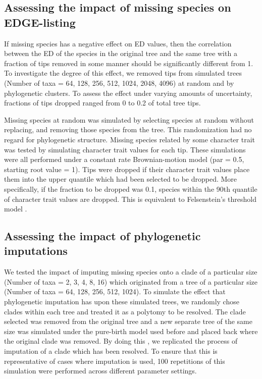 \documentclass[12pt,english]{article}
\begin{document}
\subsection*{Assessing the impact of missing species on EDGE-listing}
If missing species has a negative effect on ED values, then the
correlation between the ED of the species in the original tree and the
same tree with a fraction of tips removed in some manner should be
significantly different from 1. To investigate the degree of this
effect, we removed tips from simulated trees (Number of taxa = 64,
128, 256, 512, 1024, 2048, 4096) at random and by phylogenetic
clusters. To assess the effect under varying amounts of uncertainty,
fractions of tips dropped ranged from 0 to 0.2 of total tree tips.

Missing species at random was simulated by selecting species at random
without replacing, and removing those species from the tree. This
randomization had no regard for phylogenetic structure. Missing
species related by some character trait was tested by simulating
character trait values for each tip. These simulations were all
performed under a constant rate Brownian-motion model (par = 0.5,
starting root value = 1). Tips were dropped if their character trait
values place them into the upper quantile which had been selected to
be dropped. More specifically, if the fraction to be dropped was 0.1,
species within the 90th quantile of character trait values are
dropped. This is equivalent to Felsenstein’s threshold model
\autocite{Felsenstein2004}.

\subsection*{Assessing the impact of phylogenetic imputations}
We tested the impact of imputing missing species onto a clade of a
particular size (Number of taxa = 2, 3, 4, 8, 16) which originated
from a tree of a particular size (Number of taxa = 64, 128, 256, 512,
1024). To simulate the effect that phylogenetic imputation has upon
these simulated trees, we randomly chose clades within each tree and
treated it as a polytomy to be resolved. The clade selected was
removed from the original tree and a new separate tree of the same
size was simulated under the pure-birth model used before and placed
back where the original clade was removed. By doing this , we
replicated the process of imputation of a clade which has been
resolved. To ensure that this is representative of cases where
imputation is used, 100 repetitions of this simulation were performed
across different parameter settings.
\end{document}
